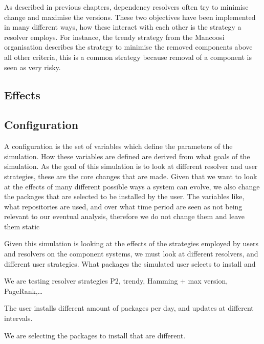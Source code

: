 As described in previous chapters, dependency resolvers often try to minimise change and maximise the versions.
These two objectives have been implemented in many different ways, how these interact with each other is the strategy a resolver employs.
For instance, the trendy strategy from the Mancoosi organisation describes the strategy to minimise the removed components above all other criteria,
this is a common strategy because removal of a component is seen as very risky.

\subsection{Effects}

\subsection{Configuration}
A configuration is the set of variables which define the parameters of the simulation.
How these variables are defined are derived from what goals of the simulation.
As the goal of this simulation is to look at different resolver and user strategies,
these are the core changes that are made.
Given that we want to look at the effects of many different possible ways a system can evolve,
we also change the packages that are selected to be installed by the user.
The variables like, what repositories are used, and over what time period are seen as not being relevant to our eventual analysis,
therefore we do not change them and leave them static

Given this simulation is looking at the effects of the strategies employed by users and resolvers on the component systems,
we must look at different resolvers, and different user strategies.
What packages the simulated user selects to install and 

We are testing resolver strategies P2, trendy, Hamming + max version, PageRank,\ldots 

The user installs different amount of packages per day, and updates at different intervals. 

We are selecting the packages to install that are different.

